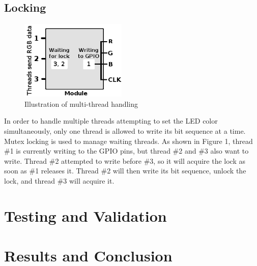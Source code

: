 \documentclass[10pt]{article}
\begin{document}
\subsection{Locking}
\noindent
\begin{figure}
    \includegraphics[width=0.45\textwidth]{figure1}
  \caption{Illustration of multi-thread handling}
\end{figure}
\noindent In order to handle multiple threads attempting to set the LED color simultaneously, only one thread is allowed to write its bit sequence at a time. Mutex locking is used to manage waiting threads. As shown in Figure 1, thread \#1 is currently writing to the GPIO pins, but thread \#2 and \#3 also want to write. Thread \#2 attempted to write before \#3, so it will acquire the lock as soon as \#1 releases it. Thread \#2 will then write its bit sequence, unlock the lock, and thread \#3 will acquire it.

\noindent 

\section{Testing and Validation}

\noindent 

\section{Results and Conclusion}

\noindent 
\end{document}
